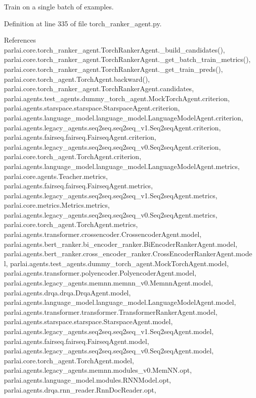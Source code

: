 \begin{DoxyVerb}Train on a single batch of examples.\end{DoxyVerb}
 

Definition at line 335 of file torch\+\_\+ranker\+\_\+agent.\+py.



References parlai.\+core.\+torch\+\_\+ranker\+\_\+agent.\+Torch\+Ranker\+Agent.\+\_\+build\+\_\+candidates(), parlai.\+core.\+torch\+\_\+ranker\+\_\+agent.\+Torch\+Ranker\+Agent.\+\_\+get\+\_\+batch\+\_\+train\+\_\+metrics(), parlai.\+core.\+torch\+\_\+ranker\+\_\+agent.\+Torch\+Ranker\+Agent.\+\_\+get\+\_\+train\+\_\+preds(), parlai.\+core.\+torch\+\_\+agent.\+Torch\+Agent.\+backward(), parlai.\+core.\+torch\+\_\+ranker\+\_\+agent.\+Torch\+Ranker\+Agent.\+candidates, parlai.\+agents.\+test\+\_\+agents.\+dummy\+\_\+torch\+\_\+agent.\+Mock\+Torch\+Agent.\+criterion, parlai.\+agents.\+starspace.\+starspace.\+Starspace\+Agent.\+criterion, parlai.\+agents.\+language\+\_\+model.\+language\+\_\+model.\+Language\+Model\+Agent.\+criterion, parlai.\+agents.\+legacy\+\_\+agents.\+seq2seq.\+seq2seq\+\_\+v1.\+Seq2seq\+Agent.\+criterion, parlai.\+agents.\+fairseq.\+fairseq.\+Fairseq\+Agent.\+criterion, parlai.\+agents.\+legacy\+\_\+agents.\+seq2seq.\+seq2seq\+\_\+v0.\+Seq2seq\+Agent.\+criterion, parlai.\+core.\+torch\+\_\+agent.\+Torch\+Agent.\+criterion, parlai.\+agents.\+language\+\_\+model.\+language\+\_\+model.\+Language\+Model\+Agent.\+metrics, parlai.\+core.\+agents.\+Teacher.\+metrics, parlai.\+agents.\+fairseq.\+fairseq.\+Fairseq\+Agent.\+metrics, parlai.\+agents.\+legacy\+\_\+agents.\+seq2seq.\+seq2seq\+\_\+v1.\+Seq2seq\+Agent.\+metrics, parlai.\+core.\+metrics.\+Metrics.\+metrics, parlai.\+agents.\+legacy\+\_\+agents.\+seq2seq.\+seq2seq\+\_\+v0.\+Seq2seq\+Agent.\+metrics, parlai.\+core.\+torch\+\_\+agent.\+Torch\+Agent.\+metrics, parlai.\+agents.\+transformer.\+crossencoder.\+Crossencoder\+Agent.\+model, parlai.\+agents.\+bert\+\_\+ranker.\+bi\+\_\+encoder\+\_\+ranker.\+Bi\+Encoder\+Ranker\+Agent.\+model, parlai.\+agents.\+bert\+\_\+ranker.\+cross\+\_\+encoder\+\_\+ranker.\+Cross\+Encoder\+Ranker\+Agent.\+model, parlai.\+agents.\+test\+\_\+agents.\+dummy\+\_\+torch\+\_\+agent.\+Mock\+Torch\+Agent.\+model, parlai.\+agents.\+transformer.\+polyencoder.\+Polyencoder\+Agent.\+model, parlai.\+agents.\+legacy\+\_\+agents.\+memnn.\+memnn\+\_\+v0.\+Memnn\+Agent.\+model, parlai.\+agents.\+drqa.\+drqa.\+Drqa\+Agent.\+model, parlai.\+agents.\+language\+\_\+model.\+language\+\_\+model.\+Language\+Model\+Agent.\+model, parlai.\+agents.\+transformer.\+transformer.\+Transformer\+Ranker\+Agent.\+model, parlai.\+agents.\+starspace.\+starspace.\+Starspace\+Agent.\+model, parlai.\+agents.\+legacy\+\_\+agents.\+seq2seq.\+seq2seq\+\_\+v1.\+Seq2seq\+Agent.\+model, parlai.\+agents.\+fairseq.\+fairseq.\+Fairseq\+Agent.\+model, parlai.\+agents.\+legacy\+\_\+agents.\+seq2seq.\+seq2seq\+\_\+v0.\+Seq2seq\+Agent.\+model, parlai.\+core.\+torch\+\_\+agent.\+Torch\+Agent.\+model, parlai.\+agents.\+legacy\+\_\+agents.\+memnn.\+modules\+\_\+v0.\+Mem\+N\+N.\+opt, parlai.\+agents.\+language\+\_\+model.\+modules.\+R\+N\+N\+Model.\+opt, parlai.\+agents.\+drqa.\+rnn\+\_\+reader.\+Rnn\+Doc\+Reader.\+opt, 